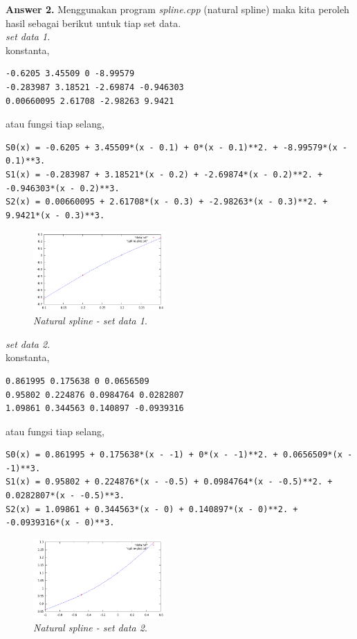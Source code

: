 \documentclass[paper=a4, fontsize=11pt]{scrartcl}
\numberwithin{equation}{section} %
\numberwithin{figure}{section} %
\numberwithin{table}{section} %
\begin{document}
\newpage
\large \textbf{Answer 2.} Menggunakan program \textit{spline.cpp} (natural spline) maka kita peroleh hasil sebagai berikut untuk tiap set data. \\ 
\textit{set data 1.} \\
konstanta,
\begin{small}
\begin{verbatim}
-0.6205 3.45509 0 -8.99579
-0.283987 3.18521 -2.69874 -0.946303
0.00660095 2.61708 -2.98263 9.9421
\end{verbatim}
\end{small}
atau fungsi tiap selang,
\begin{small}
\begin{verbatim}
S0(x) = -0.6205 + 3.45509*(x - 0.1) + 0*(x - 0.1)**2. + -8.99579*(x - 0.1)**3.
S1(x) = -0.283987 + 3.18521*(x - 0.2) + -2.69874*(x - 0.2)**2. + -0.946303*(x - 0.2)**3.
S2(x) = 0.00660095 + 2.61708*(x - 0.3) + -2.98263*(x - 0.3)**2. + 9.9421*(x - 0.3)**3.
\end{verbatim}
\end{small}
\begin{figure}
	\centering
	\includegraphics[width=0.45\textwidth]
		{spline-data1.png}
	\caption{\textit{Natural spline - set data 1}.}
\end{figure}

\textit{set data 2.}\\
konstanta,
\begin{small}
\begin{verbatim}
0.861995 0.175638 0 0.0656509
0.95802 0.224876 0.0984764 0.0282807
1.09861 0.344563 0.140897 -0.0939316
\end{verbatim}
\end{small}
atau fungsi tiap selang,
\begin{small}
\begin{verbatim}
S0(x) = 0.861995 + 0.175638*(x - -1) + 0*(x - -1)**2. + 0.0656509*(x - -1)**3.
S1(x) = 0.95802 + 0.224876*(x - -0.5) + 0.0984764*(x - -0.5)**2. + 0.0282807*(x - -0.5)**3.
S2(x) = 1.09861 + 0.344563*(x - 0) + 0.140897*(x - 0)**2. + -0.0939316*(x - 0)**3.
\end{verbatim}
\end{small}
\begin{figure}
	\centering
	\includegraphics[width=0.45\textwidth]
		{spline-data2.png}
	\caption{\textit{Natural spline - set data 2}.}
\end{figure}
\end{document}
